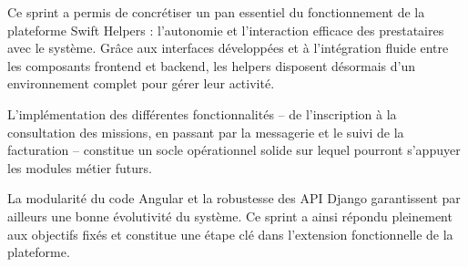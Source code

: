 Ce sprint a permis de concrétiser un pan essentiel du fonctionnement de la plateforme Swift Helpers : l’autonomie et l’interaction efficace des prestataires avec le système. Grâce aux interfaces développées et à l’intégration fluide entre les composants frontend et backend, les helpers disposent désormais d’un environnement complet pour gérer leur activité.

L’implémentation des différentes fonctionnalités – de l’inscription à la consultation des missions, en passant par la messagerie et le suivi de la facturation – constitue un socle opérationnel solide sur lequel pourront s’appuyer les modules métier futurs.

La modularité du code Angular et la robustesse des API Django garantissent par ailleurs une bonne évolutivité du système. Ce sprint a ainsi répondu pleinement aux objectifs fixés et constitue une étape clé dans l’extension fonctionnelle de la plateforme.

